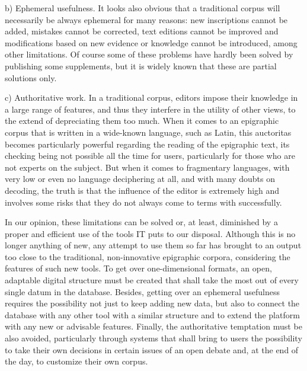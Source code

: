 \documentclass[amsthm,ebook]{saparticle}
\begin{document}
b) Ephemeral usefulness. It looks also obvious that a traditional corpus will necessarily be always ephemeral for many
reasons: new inscriptions cannot be added, mistakes cannot be corrected, text editions cannot be improved and
modifications based on new evidence or knowledge cannot be introduced, among other limitations. Of course some of these
problems have hardly been solved by publishing some supplements, but it is widely known that these are partial
solutions only.

c) Authoritative work. In a traditional corpus, editors impose their knowledge in a large range of features, and thus
they interfere in the utility of other views, to the extend of depreciating them too much. When it comes to an
epigraphic corpus that is written in a wide-known language, such as Latin, this auctoritas becomes particularly
powerful regarding the reading of the epigraphic text, its checking being not possible all the time for users,
particularly for those who are not experts on the subject. But when it comes to fragmentary languages, with very low or
even no language deciphering at all, and with many doubts on decoding, the truth is that the influence of the editor is
extremely high and involves some risks that they do not always come to terms with successfully.

In our opinion, these limitations can be solved or, at least, diminished by a proper and efficient use of the tools IT
puts to our disposal. Although this is no longer anything of new, any attempt to use them so far has brought to an
output too close to the traditional, non-innovative epigraphic corpora, considering the features of such new tools. To
get over one-dimensional formats, an open, adaptable digital structure must be created that shall take the most out of
every single datum in the database. Besides, getting over an ephemeral usefulness requires the possibility not just to
keep adding new data, but also to connect the database with any other tool with a similar structure and to extend the
platform with any new or advisable features. Finally, the authoritative temptation must be also avoided, particularly
through systems that shall bring to users the possibility to take their own decisions in certain issues of an open
debate and, at the end of the day, to customize their own corpus.
\end{document}
